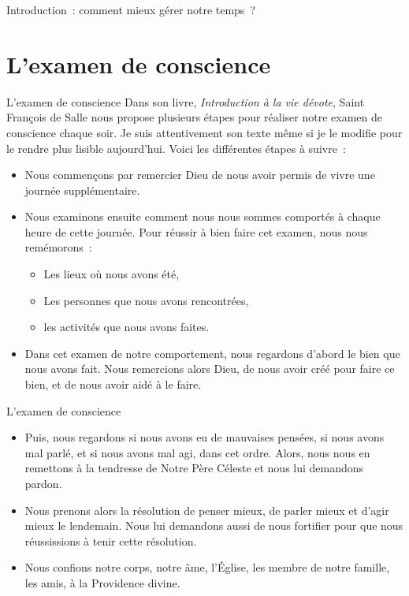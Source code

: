 \documentclass[11pt,xcolor=dvipsname,ignorenonframetext,handout]{beamer}
\begin{document}
\begin{frame}{Introduction~: comment mieux gérer notre temps~?}
\section{L'examen de conscience}
\begin{frame}{L'examen de conscience}
\rightskip=0pt\leftskip=0pt
Dans son livre, \emph{Introduction à la vie dévote}, Saint François de Salle nous propose plusieurs étapes pour réaliser notre examen de conscience chaque soir. Je suis attentivement son texte même si je le modifie pour le rendre plus lisible aujourd'hui. Voici les différentes étapes à suivre~:
    \begin{itemize}
        \rightskip=0pt\leftskip=0pt
        \item Nous commençons par remercier Dieu de nous avoir permis de vivre une journée supplémentaire.
        \item Nous examinons ensuite comment nous nous sommes comportés à chaque heure de cette journée. Pour réussir à bien faire cet examen, nous nous remémorons~:
        \begin{itemize}
            \item Les lieux où nous avons été, 
            \item Les personnes que nous avons rencontrées, 
            \item les activités que nous avons faites.
        \end{itemize}
        \item Dans cet examen de notre comportement, nous regardons d'abord le bien que nous avons fait. Nous remercions alors Dieu, de nous avoir créé pour faire ce bien, et de nous avoir aidé à le faire.
    \end{itemize}
\end{frame}
\begin{frame}{L'examen de conscience}
\begin{itemize}
        \rightskip=0pt\leftskip=0pt
        \item Puis, nous regardons si nous avons eu de mauvaises pensées, si nous avons mal parlé, et si nous avons mal agi, dans cet ordre. Alors, nous nous en remettons à la tendresse de Notre Père Céleste et nous lui demandons pardon.
        \item Nous prenons alors la résolution de penser mieux, de parler mieux et d'agir mieux le lendemain. Nous lui demandons aussi de nous fortifier pour que nous réussissions à tenir cette résolution.
        \item Nous confions notre corps, notre âme, l'Église, les membre de notre famille, les amis, à la Providence divine.

\end{itemize}
\end{frame}
\end{frame}
\end{document}
